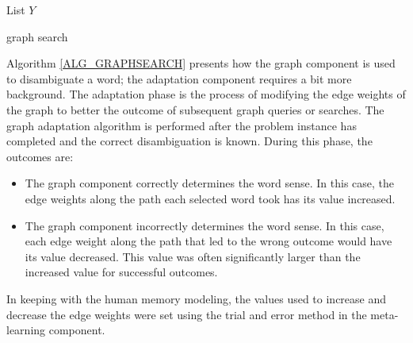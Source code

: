 \IncMargin{1em}
\begin{algorithm}
\DontPrintSemicolon
{}
\BlankLine
	List $Y$\;

	\Return {}\;
\caption{graph search\label{ALG_GRAPHSEARCH}}
\end{algorithm}\DecMargin{1em}


Algorithm \ref{ALG_GRAPHSEARCH} presents how the graph component is used to 
disambiguate a word; the adaptation component requires a bit more background. 
The adaptation phase is the process of modifying the edge weights of the graph 
to better the outcome of subsequent graph queries or searches. The graph adaptation 
algorithm is performed after the problem instance has completed and the correct 
disambiguation is known.  During this phase, the outcomes are: 

\begin{itemize}      
	\item The graph component correctly determines the word sense. 
	In this case, the edge weights along the path each selected 
	word took has its value increased.
	\item The graph component incorrectly determines the word sense. 
	In this case, each edge weight along the path that led to the 
	wrong outcome would have its value decreased. This value was often significantly larger than the 
	increased value for successful outcomes.      
\end{itemize}

In keeping with the human memory modeling, the values used to increase and decrease the edge 
weights were set using the trial and error method in the meta-learning component.

